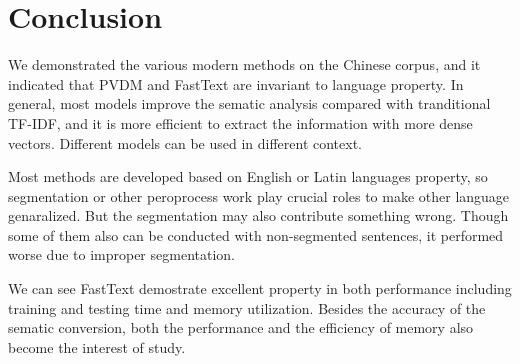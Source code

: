 \section{Conclusion}

We demonstrated the various modern methods on the Chinese corpus, and it indicated that PVDM and FastText are invariant to language property. 
In general, most models improve the sematic analysis compared with tranditional TF-IDF, and it is more efficient to extract the information with more dense vectors.
Different models can be used in different context.

Most methods are developed based on English or Latin languages property, so segmentation or other peroprocess work play crucial roles to make other language genaralized.
But the segmentation may also contribute something wrong. Though some of them also can be conducted with non-segmented sentences, it performed worse due to improper segmentation.

We can see FastText demostrate excellent property in both performance including training and testing time and memory utilization. 
Besides the accuracy of the sematic conversion, both the performance and the efficiency of memory also become the interest of study.

